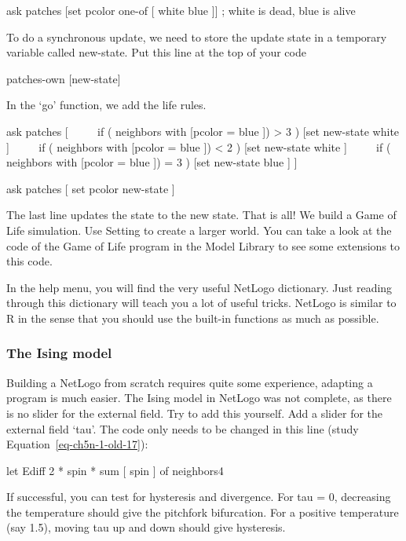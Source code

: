 \documentclass[
  a4paper,
  DIV=11,
  numbers=noendperiod]{scrreprt}
\begin{document}
{ask} {patches} {{[}}{set} {pcolor one-of} {{[}} {white blue} {]}{]} {;
white is dead, blue is alive}

To do a synchronous update, we need to store the update state in a
temporary variable called new-state. Put this line at the top of your
code

{patches-own} {{[}new-state{]}}

In the `go' function, we add the life rules.

{ask} {patches} {{[}} ~~~~ {if} {(} {neighbors with} {{[}}{pcolor =}
{blue} {]}) {\textgreater{}} {3} {)} {{[}}{set} {new-state} {white} {]}
~~~~ {if} {(} {neighbors with} {{[}}{pcolor =} {blue} {]}) {\textless{}}
{2} {)} {{[}}{set} {new-state} {white} {]} ~~~~ {if} {(} {neighbors
with} {{[}}{pcolor =} {blue} {]}) {=} {3} {)} {{[}}{set} {new-state}
{blue} {]} {{]}}

{ask} {patches} {[} {}{set} {pcolor} {new-state} {]}

The last line updates the state to the new state. That is all! We build
a Game of Life simulation. Use Setting to create a larger world. You can
take a look at the code of the Game of Life program in the Model Library
to see some extensions to this code.

In the help menu, you will find the very useful NetLogo dictionary. Just
reading through this dictionary will teach you a lot of useful tricks.
NetLogo is similar to R in the sense that you should use the built-in
functions as much as possible.

\hypertarget{sec-The-Ising-model}{%
\subsubsection{The Ising model}\label{sec-The-Ising-model}}

Building a NetLogo from scratch requires quite some experience, adapting
a program is much easier. The Ising model in NetLogo was not complete,
as there is no slider for the external field. Try to add this yourself.
Add a slider for the external field `tau'. The code only needs to be
changed in this line (study Equation~\ref{eq-ch5n-1-old-17}):

{let} {Ediff} {2} {*} {spin} {* sum} {{[} spin {]}} {of neighbors4}

If successful, you can test for hysteresis and divergence. For tau = 0,
decreasing the temperature should give the pitchfork bifurcation. For a
positive temperature (say 1.5), moving tau up and down should give
hysteresis.
\end{document}
